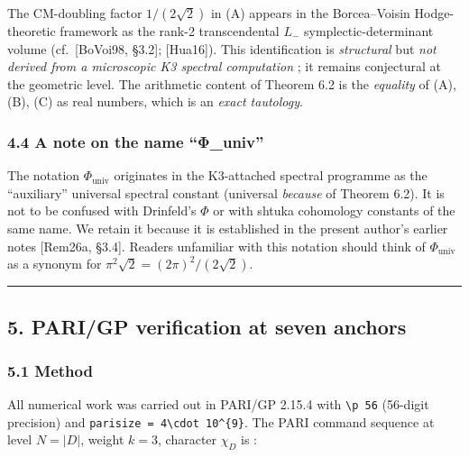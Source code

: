 \documentclass[
  11pt,
  a4paper,
]{amsart}
\begin{document}
The CM-doubling factor \(1/(2\sqrt 2)\) in (A) appears in the Borcea--Voisin Hodge-theoretic framework as the rank-2 transcendental \(L_-\) symplectic-determinant volume (cf.~{[}BoVoi98, §3.2{]}; {[}Hua16{]}). This identification is \emph{structural} but \emph{not derived from a microscopic K3 spectral computation} ; it remains conjectural at the geometric level. The arithmetic content of Theorem 6.2 is the \emph{equality} of (A), (B), (C) as real numbers, which is an \emph{exact tautology}.

\hypertarget{a-note-on-the-name-ux3c6_univ}{%
\subsubsection{4.4 A note on the name ``Φ\_univ''}\label{a-note-on-the-name-ux3c6_univ}}

The notation \(\Phi_{\mathrm{univ}}\) originates in the K3-attached spectral programme as the ``auxiliary'' universal spectral constant (universal \emph{because} of Theorem 6.2). It is not to be confused with Drinfeld's \(\Phi\) or with shtuka cohomology constants of the same name. We retain it because it is established in the present author's earlier notes {[}Rem26a, §3.4{]}. Readers unfamiliar with this notation should think of \(\Phi_{\mathrm{univ}}\) as a synonym for \(\pi^{2}\sqrt 2 = (2\pi)^{2}/(2\sqrt 2)\).

\begin{center}\rule{0.5\linewidth}{0.5pt}\end{center}

\hypertarget{parigp-verification-at-seven-anchors}{%
\subsection{5. PARI/GP verification at seven anchors}\label{parigp-verification-at-seven-anchors}}

\hypertarget{method}{%
\subsubsection{5.1 Method}\label{method}}

All numerical work was carried out in PARI/GP 2.15.4 with \texttt{\textbackslash{}p\ 56} (56-digit precision) and \texttt{parisize\ =\ 4\textbackslash{}cdot\ 10\^{}\{9\}}. The PARI command sequence at level \(N = |D|\), weight \(k = 3\), character \(\chi_D\) is :
\end{document}
